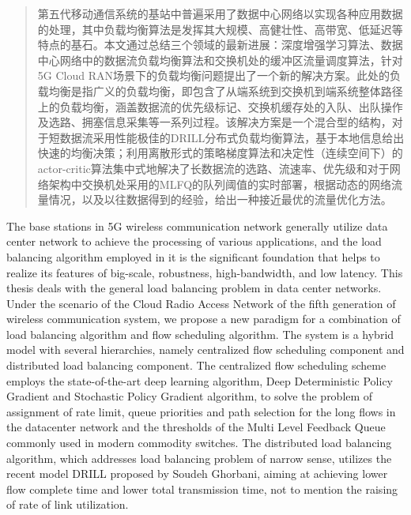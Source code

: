 
\begin{abstract}
第五代移动通信系统的基站中普遍采用了数据中心网络以实现各种应用数据的处理，其中负载均衡算法是发挥其大规模、高健壮性、高带宽、低延迟等特点的基石。本文通过总结三个领域的最新进展：深度增强学习算法、数据中心网络中的数据流负载均衡算法和交换机处的缓冲区流量调度算法，针对5G Cloud RAN场景下的负载均衡问题提出了一个新的解决方案。此处的负载均衡是指广义的负载均衡，即包含了从端系统到交换机到端系统整体路径上的负载均衡，涵盖数据流的优先级标记、交换机缓存处的入队、出队操作及选路、拥塞信息采集等一系列过程。该解决方案是一个混合型的结构，对于短数据流采用性能极佳的DRILL分布式负载均衡算法，基于本地信息给出快速的均衡决策；利用离散形式的策略梯度算法和决定性（连续空间下）的actor-critic算法集中式地解决了长数据流的选路、流速率、优先级和对于网络架构中交换机处采用的MLFQ的队列阈值的实时部署，根据动态的网络流量情况，以及以往数据得到的经验，给出一种接近最优的流量优化方法。

\end{abstract}

\begin{englishabstract}

The base stations in 5G wireless communication network generally utilize data center network to achieve the processing of various applications, and the load balancing algorithm employed in it is the significant foundation that helps to realize its features of big-scale, robustness, high-bandwidth, and low latency. This thesis deals with the general load balancing problem in data center networks. Under the scenario of the Cloud Radio Access Network of the fifth generation of wireless communication system, we propose a new paradigm for a combination of load balancing algorithm and flow scheduling algorithm. The system is a hybrid model with several hierarchies, namely centralized flow scheduling component and distributed load balancing component. The centralized flow scheduling scheme employs the state-of-the-art deep learning algorithm, Deep Deterministic Policy Gradient and Stochastic Policy Gradient algorithm, to solve the problem of assignment of rate limit, queue priorities and path selection for the long flows in the datacenter network and the thresholds of the Multi Level Feedback Queue commonly used in modern commodity switches. The distributed load balancing algorithm, which addresses load balancing problem of narrow sense, utilizes the recent model DRILL proposed by Soudeh Ghorbani, aiming at achieving lower flow complete time and lower total transmission time, not to mention the raising of rate of link utilization.

\end{englishabstract}

